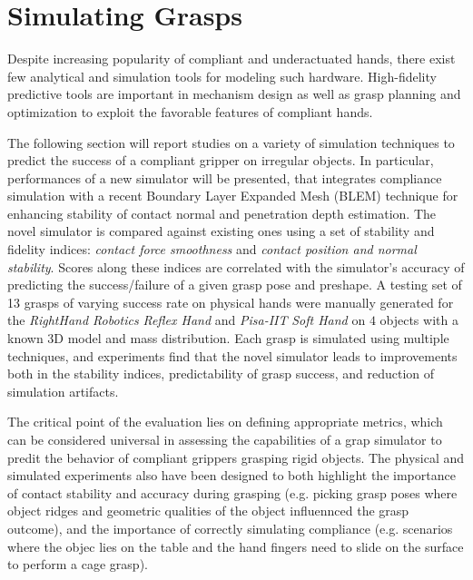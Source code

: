 \section{Simulating Grasps}

Despite increasing popularity of compliant and underactuated hands, there exist few analytical and simulation tools for modeling such hardware.  High-fidelity predictive tools are important in mechanism design as well as grasp planning and optimization to exploit the favorable features of compliant hands.

The following section will report studies \cite{Rocchi2016-jq} on a variety of simulation techniques to predict the success of a compliant gripper on irregular objects.  In particular, performances of a new simulator will be presented, that integrates compliance simulation with a recent Boundary Layer Expanded Mesh (BLEM) technique for enhancing stability of contact normal and penetration depth estimation.
The novel simulator is compared against existing ones using a set of stability and fidelity indices: \emph{contact force smoothness} and \emph{contact position and normal stability}.
Scores along these indices are correlated with the simulator's accuracy of predicting the success/failure of a given grasp pose and preshape.  
A testing set of 13 grasps of varying success rate on physical hands were manually generated for the  \emph{RightHand Robotics} \emph{Reflex Hand} and \emph{Pisa-IIT} \emph{Soft Hand} on $4$ objects with a known 3D model and mass distribution. 
Each grasp is simulated using multiple techniques, and experiments find that the novel simulator leads to improvements both in the stability indices, predictability of grasp success, and reduction of simulation artifacts.

The critical point of the evaluation lies on defining appropriate metrics, which can be considered universal in assessing the capabilities of a grap simulator to predit the behavior of compliant grippers grasping rigid objects. The physical and simulated experiments also have been designed to both highlight the importance of contact stability and accuracy during grasping (e.g. picking grasp poses where object ridges and geometric qualities of the object influennced the grasp outcome), and the importance of correctly simulating compliance (e.g. scenarios where the objec lies on the table and the hand fingers need to slide on the surface to perform a cage grasp).

